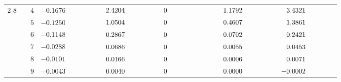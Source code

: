 \begin{table}[htbp]
{\begin{tabular}{ccrrrrrr}
      \cmidrule(l){2-8}
                                                                                  &                         & $4$                     & ${-}0.1676\phantom{{}\pm0.0000}$                     & $\hdneg2.4204\phantom{{}\pm0.0000}$                  & $\hddig0\phantom{.0000}\phantom{{}\pm0.0000}$        & $\hdneg1.1792\phantom{{}\pm0.0000}$                  & $\hdneg\hddig3.4321\phantom{{}\pm0.0000}$                  \\
                                                                                  &                         & $5$                     & ${-}0.1250\phantom{{}\pm0.0000}$                     & $\hdneg1.0504\phantom{{}\pm0.0000}$                  & $\hddig0\phantom{.0000}\phantom{{}\pm0.0000}$        & $\hdneg0.4607\phantom{{}\pm0.0000}$                  & $\hdneg\hddig1.3861\phantom{{}\pm0.0000}$                  \\
                                                                                  &                         & $6$                     & ${-}0.1148\phantom{{}\pm0.0000}$                     & $\hdneg0.2867\phantom{{}\pm0.0000}$                  & $\hddig0\phantom{.0000}\phantom{{}\pm0.0000}$        & $\hdneg0.0702\phantom{{}\pm0.0000}$                  & $\hdneg\hddig0.2421\phantom{{}\pm0.0000}$                  \\
                                                                                  &                         & $7$                     & ${-}0.0288\phantom{{}\pm0.0000}$                     & $\hdneg0.0686\phantom{{}\pm0.0000}$                  & $\hddig0\phantom{.0000}\phantom{{}\pm0.0000}$        & $\hdneg0.0055\phantom{{}\pm0.0000}$                  & $\hdneg\hddig0.0453\phantom{{}\pm0.0000}$                  \\
                                                                                  &                         & $8$                     & ${-}0.0101\phantom{{}\pm0.0000}$                     & $\hdneg0.0166\phantom{{}\pm0.0000}$                  & $\hddig0\phantom{.0000}\phantom{{}\pm0.0000}$        & $\hdneg0.0006\phantom{{}\pm0.0000}$                  & $\hdneg\hddig0.0071\phantom{{}\pm0.0000}$                  \\
                                                                                  &                         & $9$                     & ${-}0.0043\phantom{{}\pm0.0000}$                     & $\hdneg0.0040\phantom{{}\pm0.0000}$                  & $\hddig0\phantom{.0000}\phantom{{}\pm0.0000}$        & $\hdneg0.0000\phantom{{}\pm0.0000}$                  & $\hddig{-}0.0002\phantom{{}\pm0.0000}$                     \\

\end{tabular}}
\end{table}
